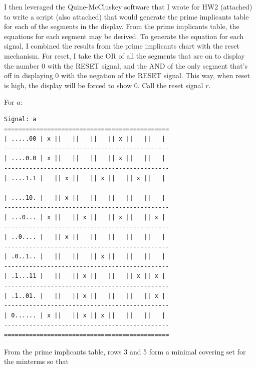 \documentclass{article}
\begin{document}
\begin{enumerate}
            I then leveraged the Quine-McCluskey software that I wrote for HW2
            (attached) to write a script (also attached) that would generate the
            prime implicants table for each of the segments in the display. From
            the prime implicants table, the equations for each segment may be
            derived. To generate the equation for each signal, I combined the
            results from the prime implicants chart with the reset mechanism.
            For reset, I take the OR of all the segments that are on to display
            the number 0 with the RESET signal, and the AND of the only segment
            that's off in displaying 0 with the negation of the RESET signal.
            This way, when reset is high, the display will be forced to show 0.
            Call the reset signal $r$.

            For $a$:
            \begin{scriptsize}
            \begin{verbatim}
Signal: a
==============================================
| .....00 | x ||   ||   ||   || x ||   ||   |
----------------------------------------------
| ....0.0 | x ||   ||   ||   || x ||   ||   |
----------------------------------------------
| ....1.1 |   || x ||   || x ||   || x ||   |
----------------------------------------------
| ....10. |   || x ||   ||   ||   ||   ||   |
----------------------------------------------
| ...0... | x ||   || x ||   || x ||   || x |
----------------------------------------------
| ..0.... |   || x ||   ||   ||   ||   ||   |
----------------------------------------------
| .0..1.. |   ||   ||   || x ||   ||   ||   |
----------------------------------------------
| .1...11 |   ||   || x ||   ||   || x || x |
----------------------------------------------
| .1..01. |   ||   || x ||   ||   ||   || x |
----------------------------------------------
| 0...... | x ||   || x || x ||   ||   ||   |
----------------------------------------------
==============================================
            \end{verbatim}
            \end{scriptsize}
            From the prime implicants table, rows 3 and 5 form a minimal
            covering set for the minterms so that 
            \pagebreak


\end{enumerate}
\end{document}
